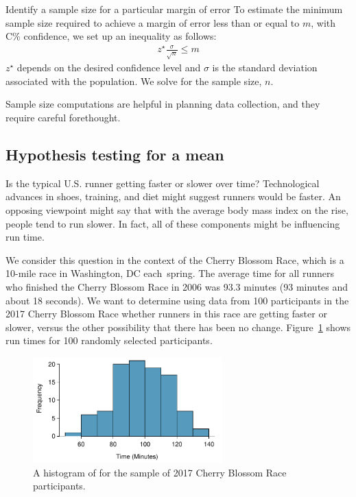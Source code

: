 \begin{onebox}{Identify a sample size for a particular margin of error}
To estimate the minimum sample size required to achieve a margin of error less than or equal to $m$, with C\% confidence, we set up an inequality as follows:  
\begin{align*}
z^{\star}\frac{\sigma}{\sqrt{n}}\leq m
\end{align*}
$z^{\star}$ depends on the desired confidence level and $\sigma$ is the standard deviation associated with the population. We solve for the sample size, $n$.
\end{onebox}

Sample size computations are helpful in planning data collection, and they require careful forethought. 



\D{\newpage}

\subsection{Hypothesis testing for a mean}
\label{oneSampleTTests}
\newcommand{\cherryblossomn}{100}
\newcommand{\cherryblossommean}{97.3}
\newcommand{\cherryblossomnull}{93.3}
\newcommand{\cherryblossomsd}{17.0}
\newcommand{\cherryblossomse}{1.7}
\newcommand{\cherryblossomt}{2.35}

Is the typical U.S. runner getting faster or slower over time? Technological advances in shoes, training, and diet might suggest runners would be faster. An opposing viewpoint might say that with the average body mass index on the rise, people tend to run slower. In fact, all of these components might be influencing run time.

We consider this question in the context of the Cherry Blossom Race, which is a 10-mile race in Washington, DC each~spring.  The average time for all runners who finished the Cherry Blossom Race in 2006 was \cherryblossomnull{} minutes (93 minutes and about 18 seconds). We want to determine using data from \cherryblossomn{} participants in the 2017 Cherry Blossom Race whether runners in this race are getting faster or slower, versus the other possibility that there has been no change.   Figure~\ref{run17SampTimeHistogram} shows run times for \cherryblossomn{} randomly selected participants.  

\begin{figure}[h]
\centering
\includegraphics[width=0.65\textwidth]{ch_inference_for_means/figures/run10SampTimeHistogram/run17SampTimeHistogram} 
\caption{A histogram of  for the sample of 2017 Cherry Blossom Race participants.}
\label{run17SampTimeHistogram}
\end{figure}


